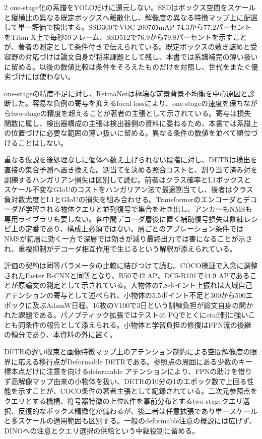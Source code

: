 \documentclass[lualatex,a4paper,10pt]{jlreq}
\begin{document}
\begin{multicols}{2}
\noindent one-stage化の系譜をYOLOだけに還元しない。SSDはボックス空間をスケールと縦横比の異なる既定ボックスへ離散化し、解像度の異なる特徴マップ上に配置して単一評価で検出する。SSD300でVOC 2007のmAP 74.3から77.2パーセントをTitan X上で毎秒59フレーム、SSD512で76.9から79.8パーセントを示すことが、著者の測定として条件付きで伝えられている。既定ボックスの敷き詰めと受容野の対応づけは論文自身が将来課題として残し、本書では系譜補完の薄い扱いに留める。以後の数値比較は条件をそろえたものだけを対照し、世代をまたぐ優劣づけには使わない。\autocite{vmd008}\par\medskip
\noindent one-stageの精度不足に対し、RetinaNetは極端な前景背景不均衡を中心原因と診断した。容易な負例の寄与を抑えるfocal lossにより、one-stageの速度を保ちながらtwo-stageの精度を超えることが著者の主張として示されている。寄与は損失関数に属し、検出器構成の主張は検出器側の資料に委ねるため、本書では系譜上の位置づけに必要な範囲の薄い扱いに留める。異なる条件の数値を並べて順位づけることはしない。\autocite{vmd009}\par\medskip
\noindent 重なる仮説を後処理なしに個体へ数え上げられない段階に対し、DETRは検出を直接の集合予測へ置き換えた。割当てを決める照合コストと、割り当て済み対を訓練するハンガリアン損失は区別して読む。前者はクラス確率とL1ボックスとスケール不変なGIoUのコストをハンガリアン法で最適割当てし、後者はクラス負対数尤度とL1とGIoUの損失を組み合わせる。Transformerのエンコーダとデコーダが学習される物体クエリと並列復号で集合を吐き出し、アンカーもNMSも専用ライブラリも要しない。各中間デコーダ層後に置く補助復号損失は訓練レシピ上の定番であり、構成上必須ではない。層ごとのアブレーション条件ではNMSが初層に効く一方で深層では効きが減り最終出力では害になることが示され、重複抑制がデコーダ相互作用で生じるという解釈が添えられている。\autocite{vmd010}\par\medskip
\noindent 評価の契約は同等パラメータの比較に結びつけて読む。COCO検証で入念に調整されたFaster R-CNNと同等となり、R50で42 AP、DC5-R101で44.9 APであることが原論文の測定として示されている。大物体の7.8ポイント上振れは大域自己アテンションの寄与として述べられ、小物体の5.5ポイント不足と300から500エポックに及ぶAdamW日程、16枚のV100で3日という訓練負担が論文自身の開かれた課題である。パノプティック拡張ではテスト46 PQでとくにstuff側に強いことも同条件の報告として添えられる。小物体と学習負担の修復はFPN流の後継の領分であり、本資料の外に置く。\autocite{vmd010}\par\medskip
\noindent DETRの遅い収束と画像特徴マップ上のアテンション制約による空間解像度の限界に応える移行点がDeformable DETRである。参照点の周囲にある少数のキー標本点だけに注意を向けるdeformable アテンションにより、FPNの助けを借りず高解像マップ由来の小物体を扱い、DETRの10分の1のエポック数で上回る性能を示すことが、COCO条件の著者主張として記録されている。二次元参照点をクエリとする機構、符号器特徴の上位K件を事前分布とするtwo-stageクエリ選択、反復的なボックス精緻化が備わるが、後二者は任意拡張であり単一スケールと多スケールの適用範囲も区別する。一般のdeformable注意の概説には広げず、DINOへの注意とクエリ選択の供給という中継役割に留める。\autocite{vmd123}\par\medskip

\end{multicols}
\end{document}
